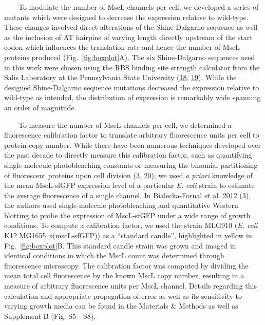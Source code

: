 ~~~~To
modulate
the
number
of
MscL
channels
per
cell,
we
developed
a
series
of
mutants
which
were
designed
to
decrease
the
expression
relative
to
wild-type.
These
changes
involved
direct
alterations
of the
Shine-Dalgarno
sequence
as
well
as the
inclusion
of AT
hairpins
of
varying
length
directly
upstream
of the
start
codon
which
influences
the
translation
rate
and
hence
the
number
of
MscL
proteins
produced
(Fig.~\ref{fig:boxplot}A).
The
six
Shine-Dalgarno
sequences
used
in
this
work
were
chosen
using
the
RBS
binding
site
strength
calculator
from
the
Salis
Laboratory
at the
Pennsylvania
State
University
(\protect\hyperlink{ref-espahborujeni2014}{18},
\protect\hyperlink{ref-salis2009}{19}).
While
the
designed
Shine-Dalgarno
sequence
mutations
decreased
the
expression
relative
to
wild-type
as
intended,
the
distribution
of
expression
is
remarkably
wide
spanning
an
order
of
magnitude.

~~~~To
measure
the
number
of
MscL
channels
per
cell,
we
determined
a
fluorescence
calibration
factor
to
translate
arbitrary
fluorescence
units
per
cell
to
protein
copy
number.
While
there
have
been
numerous
techniques
developed
over
the
past
decade
to
directly
measure
this
calibration
factor,
such
as
quantifying
single-molecule
photobleaching
constants
or
measuring
the
binomial
partitioning
of
fluorescent
proteins
upon
cell
division
(\protect\hyperlink{ref-bialecka-fornal2012}{3},
\protect\hyperlink{ref-elowitz2002}{20}),
we
used
\emph{a
priori}
knowledge
of the
mean
MscL-sfGFP
expression
level
of a
particular
\emph{E.
coli}
strain
to
estimate
the
average
fluorescence
of a
single
channel.
In
Bialecka-Fornal
et al.
2012
(\protect\hyperlink{ref-bialecka-fornal2012}{3}),
the
authors
used
single-molecule
photobleaching
and
quantitative
Western
blotting
to
probe
the
expression
of
MscL-sfGFP
under
a wide
range
of
growth
conditions.
To
compute
a
calibration
factor,
we
used
the
strain
MLG910
(\emph{E.
coli}
K12
MG1655
\(\phi\)(mscL-sfGFP))
as a
``standard
candle'',
highlighted
in
yellow
in
Fig.~\ref{fig:boxplot}B.
This
standard
candle
strain
was
grown
and
imaged
in
identical
conditions
in
which
the
MscL
count
was
determined
through
fluorescence
microscopy.
The
calibration
factor
was
computed
by
dividing
the
mean
total
cell
fluorescence
by the
known
MscL
copy
number,
resulting
in a
measure
of
arbitrary
fluorescence
units
per
MscL
channel.
Details
regarding
this
calculation
and
appropriate
propagation
of
error
as
well
as its
sensitivity
to
varying
growth
media
can be
found
in the
Materials
\&
Methods
as
well
as
Supplement
B
(Fig.
S5 -
S8).

